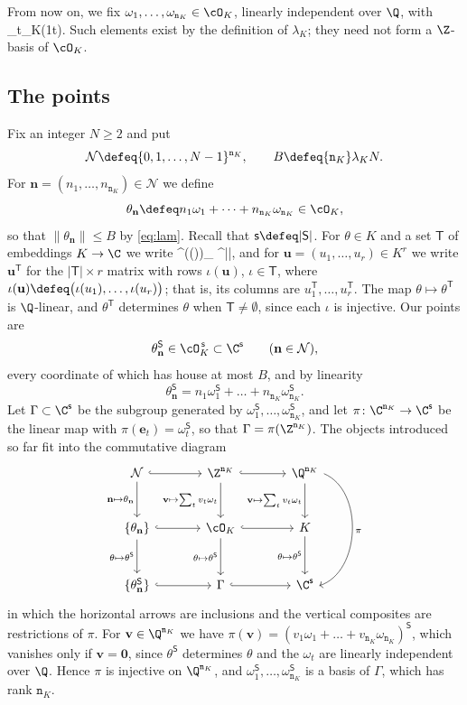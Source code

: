\documentclass[11pt, reqno, twoside, letterpaper]{amsart}
\newcommand{\vn}{\mathbf{n}}
\newcommand{\ve}{\mathbf{e}}
\newcommand{\vu}{\mathbf{u}}
\newcommand{\vv}{\mathbf{v}}
\newcommand{\vzero}{\mathbf{0}}
\newcommand{\house}[1]{\lVert #1\rVert}
\newcommand{\dK}{{\mathtt{n}_K}}
\newcommand{\bxs}{N}
\newcommand{\hB}{B}
\newcommand{\lamK}{\lambda_{\Kf}}
\newcommand{\Kf}{K}
\newcommand{\lat}{\Gamma}
\newcommand{\Sset}{\mathsf{S}}
\newcommand{\nS}{\mathsf{s}}
\newcommand{\Tset}{\mathsf{T}}
\newcommand{\cube}{\mathcal{N}}
\begin{document}
From now on, we fix $\omega_1,\dots,\omega_\dK\in\cO_\Kf$, linearly
independent over $\Q$, with
\be\label{eq:lam}
\house{\omega_t}\le\lamK\qquad(1\le t\le \dK).
\ee
Such elements exist by the definition of $\lamK$; they need not form a
$\Z$-basis of $\cO_\Kf$.

\subsection{The points}

Fix an integer $\bxs\ge 2$ and put
\[
\cube\defeq\{0,1,\dots,\bxs-1\}^{\dK},\qquad
\hB\defeq\dK\lamK\bxs.
\]
For $\vn=(n_1,\dots,n_\dK)\in\cube$ we define
\[
\theta_\vn\defeq n_1\omega_1+\dots+n_\dK\omega_\dK\in\cO_\Kf,
\]
so that $\house{\theta_\vn}\le\hB$ by \eqref{eq:lam}. Recall that
$\nS\defeq|\Sset|$. For $\theta\in\Kf$ and a set $\Tset$ of embeddings
$\Kf\to\C$ we write
\be
\theta^{\Tset}\big(\iota(\theta)\big)_{\iota\in\Tset}
\in\C^{|\Tset|},
\ee
and for $\vu=(u_1,\dots,u_r)\in\Kf^r$ we write $\vu^{\Tset}$ for the
$|\Tset|\times r$ matrix with rows $\iota(\vu)$, $\iota\in\Tset$,
where $\iota(\vu)\defeq\big(\iota(u_1),\dots,\iota(u_r)\big)$; that
is, its columns are $u_1^{\Tset},\dots,u_r^{\Tset}$. The map
$\theta\mapsto\theta^{\Tset}$ is $\Q$-linear, and $\theta^{\Tset}$
determines $\theta$ when $\Tset\ne\emptyset$, since each $\iota$ is
injective. Our points are
\[
\theta_\vn^{\Sset}\in\cO_\Kf^{\,\nS}\subset\C^{\nS}\qquad(\vn\in\cube),
\]
every coordinate of which has house at most $\hB$, and by linearity
\[
\theta_\vn^{\Sset}=n_1\omega_1^{\Sset}+\dots+n_\dK\omega_\dK^{\Sset}.
\]
Let $\lat\subset\C^{\nS}$ be the subgroup generated by
$\omega_1^{\Sset},\dots,\omega_\dK^{\Sset}$, and let
$\pi\colon\C^{\dK}\to\C^{\nS}$ be the linear map with
$\pi(\ve_t)=\omega_t^{\Sset}$, so that $\lat=\pi(\Z^{\dK})$. The
objects introduced so far fit into the commutative diagram
\[
\begin{tikzcd}[row sep=large, column sep=large]
\cube \arrow[r, hook] \arrow[d, "\vn\mapsto\theta_\vn"']
& \Z^{\dK} \arrow[r, hook] \arrow[d, "\vv\mapsto\sum_t v_t\omega_t"']
& \Q^{\dK} \arrow[d, "\vv\mapsto\sum_t v_t\omega_t"']
\arrow[dd, bend left=70, "\pi", start anchor=east, end anchor=east] \\
\{\theta_\vn\} \arrow[r, hook]
\arrow[d, "\theta\mapsto\theta^{\Sset}"']
& \cO_\Kf \arrow[r, hook]
\arrow[d, "\theta\mapsto\theta^{\Sset}"']
& \Kf \arrow[d, "\theta\mapsto\theta^{\Sset}"'] \\
\{\theta_\vn^{\Sset}\} \arrow[r, hook] & \lat \arrow[r, hook]
& \C^{\nS}
\end{tikzcd}
\]
in which the horizontal arrows are inclusions and the vertical
composites are restrictions of $\pi$. For $\vv\in\Q^{\dK}$ we have
$\pi(\vv)=(v_1\omega_1+\dots+v_\dK\omega_\dK)^{\Sset}$, which vanishes
only if $\vv=\vzero$, since $\theta^{\Sset}$ determines $\theta$ and
the $\omega_t$ are linearly independent over $\Q$. Hence $\pi$ is
injective on $\Q^{\dK}$, and
$\omega_1^{\Sset},\dots,\omega_\dK^{\Sset}$ is a basis of $\lat$,
which has rank $\dK$.
\end{document}
